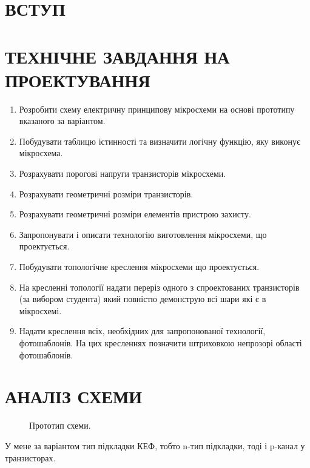 \documentclass[a4paper,14pt]{extreport}
\begin{document}
\newpage
\chapter{ВСТУП}

\newpage
\chapter{ТЕХНІЧНЕ ЗАВДАННЯ НА ПРОЕКТУВАННЯ}

\begin{enumerate}
  \item Розробити схему електричну принципову мікросхеми на основі прототипу вказаного за варіантом.
    \item Побудувати таблицю істинності та визначити логічну функцію, яку виконує мікросхема.
    \item Розрахувати порогові напруги транзисторів мікросхеми.
   \item Розрахувати геометричні розміри транзисторів.
    \item Розрахувати геометричні розміри елементів пристрою захисту.
    \item Запропонувати і описати технологію виготовлення мікросхеми, що проектується.
    \item Побудувати топологічне креслення мікросхеми що проектується.
    \item На кресленні топології надати переріз одного з спроектованих транзисторів (за вибором студента) який повністю демонструю всі шари які є в мікросхемі.
    \item Надати креслення всіх, необхідних для запропонованої технології, фотошаблонів. На цих кресленнях позначити штриховкою непрозорі області фотошаблонів.
\end{enumerate}

\newpage
\chapter{АНАЛІЗ СХЕМИ}

  \begin{figure}[h!]
  \caption{Прототип схеми.}
  \label{ris1}
  \end{figure}
  У мене за варіантом тип підкладки КЕФ, тобто n-тип підкладки, тоді і p-канал у транзисторах.\\
\end{document}
